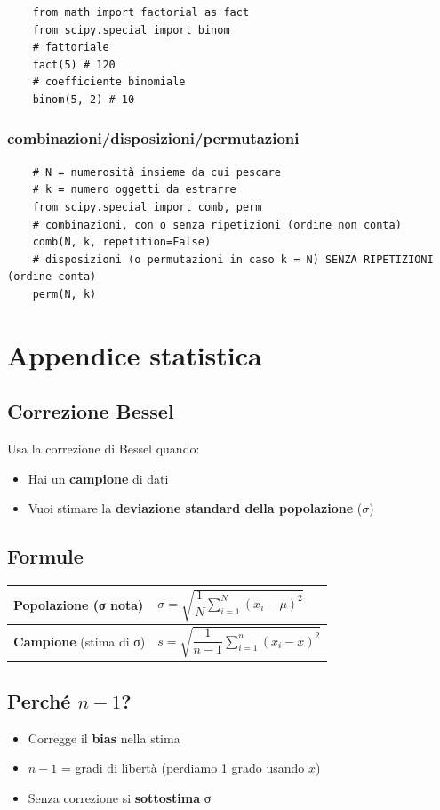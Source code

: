 \documentclass{article}
\begin{document}
\begin{lstlisting}
    from math import factorial as fact
    from scipy.special import binom
    # fattoriale
    fact(5) # 120
    # coefficiente binomiale
    binom(5, 2) # 10
\end{lstlisting}

\subsubsection*{combinazioni/disposizioni/permutazioni}

\begin{lstlisting}
    # N = numerosità insieme da cui pescare
    # k = numero oggetti da estrarre
    from scipy.special import comb, perm
    # combinazioni, con o senza ripetizioni (ordine non conta)
    comb(N, k, repetition=False)
    # disposizioni (o permutazioni in caso k = N) SENZA RIPETIZIONI (ordine conta)
    perm(N, k)
\end{lstlisting}

\pagebreak

\section*{Appendice statistica}

\subsection*{Correzione Bessel}
Usa la correzione di Bessel quando:
\begin{itemize}
    \item Hai un \textbf{campione} di dati
    \item Vuoi stimare la \textbf{deviazione standard della popolazione} ($\sigma$)
\end{itemize}

\subsection*{Formule}
\begin{tabular}{|l|l|}
\hline
\textbf{Popolazione} (σ nota) & $\sigma = \sqrt{\dfrac{1}{N}\sum\limits_{i=1}^N (x_i - \mu)^2}$ \\
\hline
\textbf{Campione} (stima di σ) & $s = \sqrt{\dfrac{1}{n-1}\sum\limits_{i=1}^n (x_i - \bar{x})^2}$ \\
\hline
\end{tabular}

\subsection*{Perché $n-1$?}
\begin{itemize}
    \item Corregge il \textbf{bias} nella stima
    \item $n-1$ = gradi di libertà (perdiamo 1 grado usando $\bar{x}$)
    \item Senza correzione si \textbf{sottostima} σ
\end{itemize}
\end{document}
